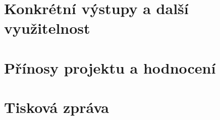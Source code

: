 \documentclass[a4paper,11pt]{article}
\begin{document}




\section{Konkrétní výstupy a další využitelnost}






\section{Přínosy projektu a hodnocení}


\section{Tisková zpráva}
\end{document}
